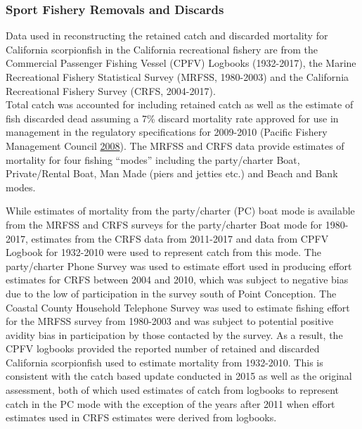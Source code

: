 \documentclass[12pt,]{article}
\begin{document}
\subsubsection{Sport Fishery Removals and
Discards}\label{sport-fishery-removals-and-discards}

Data used in reconstructing the retained catch and discarded mortality
for California scorpionfish in the California recreational fishery are
from the Commercial Passenger Fishing Vessel (CPFV) Logbooks
(1932-2017), the Marine Recreational Fishery Statistical Survey (MRFSS,
1980-2003) and the California Recreational Fishery Survey (CRFS,
2004-2017).\\
Total catch was accounted for including retained catch as well as the
estimate of fish discarded dead assuming a 7\% discard mortality rate
approved for use in management in the regulatory specifications for
2009-2010 (Pacific Fishery Management Council
\protect\hyperlink{ref-PFMC2008}{2008}). The MRFSS and CRFS data provide
estimates of mortality for four fishing ``modes'' including the
party/charter Boat, Private/Rental Boat, Man Made (piers and jetties
etc.) and Beach and Bank modes.

While estimates of mortality from the party/charter (PC) boat mode is
available from the MRFSS and CRFS surveys for the party/charter Boat
mode for 1980-2017, estimates from the CRFS data from 2011-2017 and data
from CPFV Logbook for 1932-2010 were used to represent catch from this
mode. The party/charter Phone Survey was used to estimate effort used in
producing effort estimates for CRFS between 2004 and 2010, which was
subject to negative bias due to the low of participation in the survey
south of Point Conception. The Coastal County Household Telephone Survey
was used to estimate fishing effort for the MRFSS survey from 1980-2003
and was subject to potential positive avidity bias in participation by
those contacted by the survey. As a result, the CPFV logbooks provided
the reported number of retained and discarded California scorpionfish
used to estimate mortality from 1932-2010. This is consistent with the
catch based update conducted in 2015 as well as the original assessment,
both of which used estimates of catch from logbooks to represent catch
in the PC mode with the exception of the years after 2011 when effort
estimates used in CRFS estimates were derived from logbooks.
\end{document}
